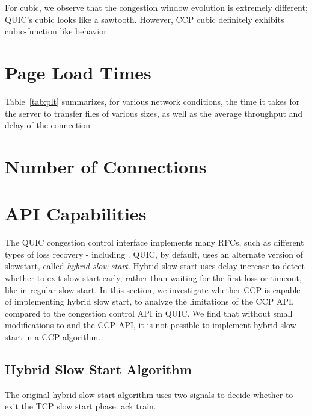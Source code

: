 \par For cubic, we observe that the congestion window evolution is extremely different; QUIC's cubic looks like a sawtooth.
However, CCP cubic definitely exhibits cubic-function like behavior.

\section{Page Load Times}
Table~\ref{tab:plt} summarizes, for various network conditions, the time it takes for the server to transfer files of various sizes, as well as the average throughput and delay of the connection

\section{Number of Connections}

\section{API Capabilities}
The QUIC congestion control interface implements many RFCs, such as different types of loss recovery - including .
QUIC, by default, uses an alternate version of slowstart, called \textit{hybrid slow start}.
Hybrid slow start uses delay increase to detect whether to exit slow start early, rather than waiting for the first loss or timeout, like in regular slow start.
In this section, we investigate whether CCP is capable of implementing hybrid slow start, to analyze the limitations of the CCP API, compared to the congestion control API in QUIC.
We find that without small modifications to  and the CCP API, it is not possible to implement hybrid slow start in a CCP algorithm.

\subsection*{Hybrid Slow Start Algorithm}
The original hybrid slow start algorithm uses two signals to decide whether to exit the TCP slow start phase: ack train.


